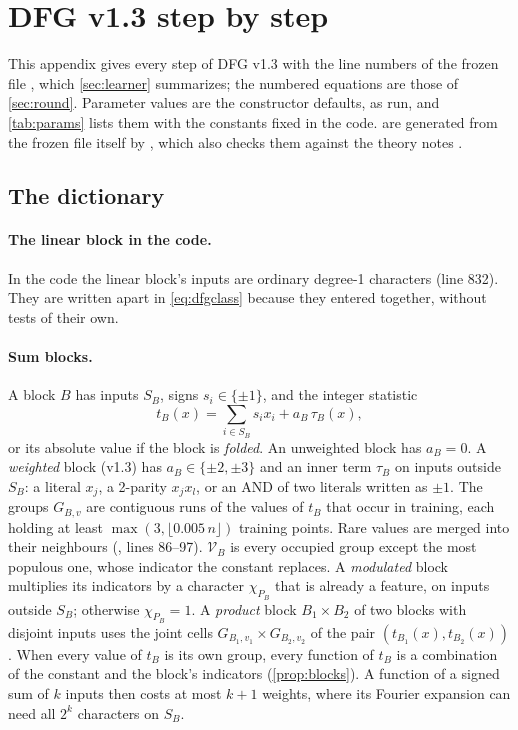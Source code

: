\clearpage
\section{DFG v1.3 step by step}\label{app:learner-full}

This appendix gives every step of DFG v1.3 with the line numbers of the frozen file , which \cref{sec:learner} summarizes; the numbered equations are those of \cref{sec:round}. Parameter values are the constructor defaults, as run, and \cref{tab:params} lists them with the constants fixed in the code.  are generated from the frozen file itself by , which also checks them against the theory notes .

\subsection{The dictionary}\label{app:learner-dict}

\paragraph{The linear block in the code.} In the code the linear block's inputs are ordinary degree-1 characters (line 832). They are written apart in \cref{eq:dfgclass} because they entered together, without tests of their own.

\paragraph{Sum blocks.} A block $B$ has inputs $S_B$, signs $s_i\in\{\pm1\}$, and the integer statistic
\[
t_B(x)=\sum_{i\in S_B}s_ix_i+a_B\,\tau_B(x),
\]
or its absolute value if the block is \emph{folded}. An unweighted block has $a_B=0$. A \emph{weighted} block (v1.3) has $a_B\in\{\pm2,\pm3\}$ and an inner term $\tau_B$ on inputs outside $S_B$: a literal $x_j$, a 2-parity $x_jx_l$, or an AND of two literals written as $\pm1$. The groups $G_{B,v}$ are contiguous runs of the values of $t_B$ that occur in training, each holding at least $\max(3,\lfloor0.005\,n\rfloor)$ training points. Rare values are merged into their neighbours (, lines 86--97). $\mathcal V_B$ is every occupied group except the most populous one, whose indicator the constant replaces. A \emph{modulated} block multiplies its indicators by a character $\chi_{P_B}$ that is already a feature, on inputs outside $S_B$; otherwise $\chi_{P_B}=1$. A \emph{product} block $B_1\times B_2$ of two blocks with disjoint inputs uses the joint cells $G_{B_1,v_1}\times G_{B_2,v_2}$ of the pair $(t_{B_1}(x),t_{B_2}(x))$. When every value of $t_B$ is its own group, every function of $t_B$ is a combination of the constant and the block's indicators (\cref{prop:blocks}). A function of a signed sum of $k$ inputs then costs at most $k+1$ weights, where its Fourier expansion can need all $2^k$ characters on $S_B$.


